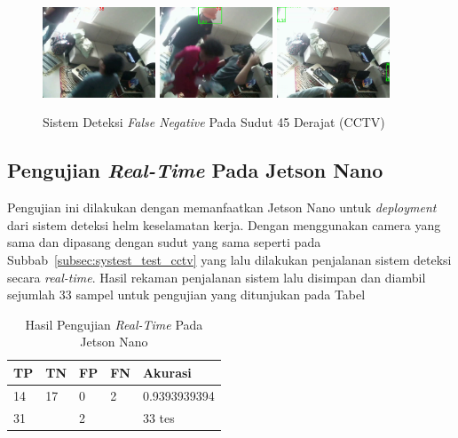 \begin{figure} [h]
    \centering
    \includegraphics[width=0.3\textwidth]{gambar/sistem_cctvori/falsenegative/cctv_perspective_pred (73).png}
    \includegraphics[width=0.3\textwidth]{gambar/sistem_cctvori/falsenegative/cctv_perspective_pred (83).png}
    \includegraphics[width=0.3\textwidth]{gambar/sistem_cctvori/falsenegative/cctv_perspective_pred (97).png}
    \caption{Sistem Deteksi \emph{False Negative} Pada Sudut 45 Derajat (CCTV)}
    \label{fig:sys_cctvori_fn}  
\end{figure}


\subsection{Pengujian \emph{Real-Time} Pada Jetson Nano}
\label{subsec:systest_test_jetsonrealtime}

\par Pengujian ini dilakukan dengan memanfaatkan Jetson Nano untuk \emph{deployment} dari sistem deteksi helm keselamatan kerja. Dengan menggunakan camera yang sama dan dipasang dengan sudut yang sama seperti pada Subbab~\ref{subsec:systest_test_cctv} yang lalu dilakukan penjalanan sistem deteksi secara \emph{real-time}. Hasil rekaman penjalanan sistem lalu disimpan dan diambil sejumlah 33 sampel untuk pengujian yang ditunjukan pada Tabel


\begin{table}
    \centering
    \caption{Hasil Pengujian \emph{Real-Time} Pada Jetson Nano}
    \label{tb:systest_jetson}
    \begin{tabular}{|l|l|l|l|l|} 
        \hline
        TP & TN                    & FP & FN                & Akurasi        \\ 
        \hline
        14 & 17                    & 0  & 2                 & 0.9393939394     \\ 
        \hline
        \multicolumn{2}{|l|}{31}   & \multicolumn{2}{l|}{2} & 33 tes  \\
        \hline
    \end{tabular}
\end{table}

